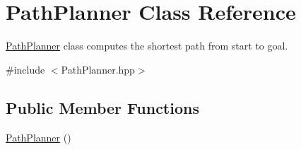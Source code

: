 \hypertarget{classPathPlanner}{}\section{Path\+Planner Class Reference}
\label{classPathPlanner}


\hyperlink{classPathPlanner}{Path\+Planner} class computes the shortest path from start to goal.  




{\ttfamily \#include $<$Path\+Planner.\+hpp$>$}

\subsection*{Public Member Functions}
\begin{DoxyCompactItemize}
\item 
\hyperlink{classPathPlanner_a376f30d795cfe0a40f8923f49336f7da}{Path\+Planner} ()\hypertarget{classPathPlanner_a376f30d795cfe0a40f8923f49336f7da}{}\label{classPathPlanner_a376f30d795cfe0a40f8923f49336f7da}


\end{DoxyCompactItemize}

